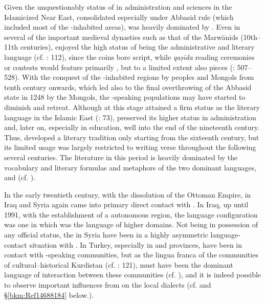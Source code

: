 \documentclass[output=paper]{langsci/langscibook}
\begin{document}
Given the unquestionably  status of  in administration and sciences in the Islamicized Near East, consolidated especially under Abbasid rule (which included most of the -inhabited areas),  was heavily dominated by . Even in several of the important medieval  dynasties such as that of the Marwānids (10th–11th centuries),  enjoyed the high status of being the administrative and literary language (cf. \citealt{James2007}: 112), since the coins bore  script, while \textit{qaṣīda} reading ceremonies or contests would feature primarily , but to a limited extent also  pieces (\citealt{Ripper2012}: 507–528). With the conquest of the -inhabited regions by  peoples and Mongols from tenth century onwards, which led also to the final overthrowing of the Abbasid state in 1248 by the Mongols, the -speaking populations may have started to diminish and retreat. Although at this stage  attained a firm status as the literary language in the Islamic East (\citealt{Perry2012}: 73),  preserved its higher status in administration and, later on, especially in education, well into the end of the nineteenth century. Thus,  developed a literary tradition only starting from the sixteenth century, but its limited usage was largely restricted to writing verse throughout the following several centuries. The literature in this period is heavily dominated by the vocabulary and literary formulas and metaphors of the two dominant languages,  and  (cf. \citealt{Öpenginforthcoming}). 

In the early twentieth century, with the dissolution of the Ottoman Empire,  in Iraq and Syria again came into primary direct contact with . In Iraq, up until 1991, with the establishment of a  autonomous region, the language configuration was one in which  was the  language of higher domains. Not being in possession of any official status, the  in Syria have been in a highly asymmetric language-contact situation with . In Turkey, especially in  and  provinces,  have been in contact with -speaking communities, but as the lingua franca of the communities of cultural–historical Kurdistan (cf. \citealt{Edwards1851}: 121),  must have been the dominant language of interaction between these communities (cf. \citealt{Lentin2012}), and it is indeed possible to observe important influences from  on the local  dialects (cf. \citealt{Jastrow2011Kurdish} and §\ref{bkm:Ref14688184} below.). 
\end{document}
